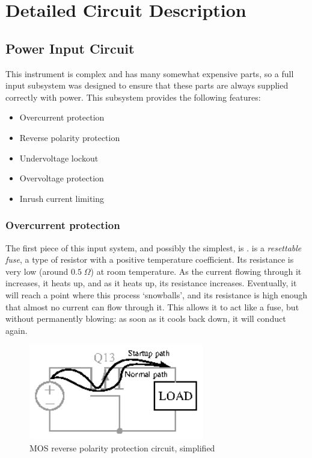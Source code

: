 \section{Detailed Circuit Description}
\subsection{Power Input Circuit}


This instrument is complex and has many somewhat expensive parts, so a full
input subsystem was designed to ensure that these parts are always supplied
correctly with power. This subsystem provides the following features:

\begin{itemize}
\item{Overcurrent protection}
\item{Reverse polarity protection}
\item{Undervoltage lockout}
\item{Overvoltage protection}
\item{Inrush current limiting}
\end{itemize}

\subsubsection{Overcurrent protection}

The first piece of this input system, and possibly the simplest, is
.  is a \emph{resettable fuse}, a type of resistor
with a positive temperature coefficient. Its resistance is very low
(around $0.5\;\Omega$) at room temperature.  As the current flowing through it
increases, it heats up, and as it heats up, its resistance increases.
Eventually, it will reach a point where this process `snowballs', and its
resistance is high enough that almost no current can flow through it. This
allows it to act like a fuse, but without permanently blowing: as soon as it
cools back down, it will conduct again.

\begin{figure}[H]
\centering
\includegraphics[width=3in]{mosrpp}
\caption{MOS reverse polarity protection circuit, simplified}
\label{fig:mosrpp}
\end{figure}

